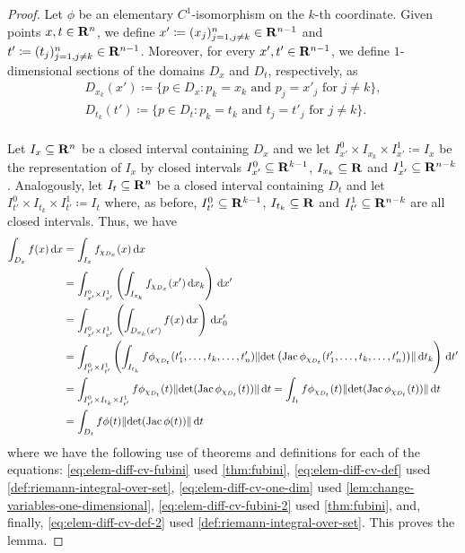 \begin{proof}
Let \(\phi\) be an elementary \(C^1\)-isomorphism on the \(k\)-th
coordinate. Given points \(x, t \in \mathbf{R}^n\), we define \(x' \coloneq (x_j)_{j=1,
j \neq k}^n \in \mathbf{R}^{n-1}\) and \(t' \coloneq (t_j)_{j=1, j \neq k}^n \in
\mathbf{R}^{n-1}\). Moreover, for every \(x', t' \in \mathbf{R}^{n-1}\), we define
\(1\)-dimensional sections of the domains \(D_x\) and \(D_t\), respectively, as
\begin{gather*}
  D_{x_k}(x') \coloneq
  \{p \in D_x \colon p_k = x_k \text{ and } p_j = x'_j \text{ for } j \neq k\}, \\
  D_{t_k}(t') \coloneq
  \{p \in D_t \colon p_k = t_k \text{ and } t_j = t'_j \text{ for } j \neq k\}. \\
\end{gather*}

Let \(I_x \subseteq \mathbf{R}^n\) be a closed interval containing \(D_x\) and we let
\(I_{x'}^0 \times I_{x_k} \times I_{x'}^1 \coloneq I_x\) be the representation
of \(I_x\) by closed intervals \(I_{x'}^0 \subseteq \mathbf{R}^{k-1}\), \(I_{x_k}
\subseteq \mathbf{R}\) and \(I_{x'}^1 \subseteq \mathbf{R}^{n-k}\). Analogously, let \(I_t
\subseteq \mathbf{R}^n\) be a closed interval containing \(D_t\) and let \(I_{t'}^0
\times I_{t_k} \times I_{t'}^1 \coloneq I_t\) where, as before, \(I_{t'}^0
\subseteq \mathbf{R}^{k-1}\), \(I_{t_k} \subseteq \mathbf{R}\) and \(I_{t'}^1 \subseteq
\mathbf{R}^{n-k}\) are all closed intervals. Thus, we have
\begin{align}
  \nonumber
  \int_{D_x} f(x)\, \mathrm{d} x
  &= \int_{I_x} f_{\chi_{D_x}}(x)\, \mathrm{d} x \\
  \label{eq:elem-diff-cv-fubini}
  &= \int_{I_{x'}^0 \times I_{x'}^1} \left(
  \int_{I_{x_k}} f_{\chi_{D_x}}(x')\, \mathrm{d} x_k
  \right)\, \mathrm{d} x' \\
  \label{eq:elem-diff-cv-def}
  &= \int_{I_{x'}^0 \times I_{x'}^1} \left(
    \int_{D_{x_k}(x')} f(x)\, \mathrm{d} x
    \right)\, \mathrm{d} x_0' \\
  \label{eq:elem-diff-cv-one-dim}
  &= \int_{I_{t'}^0 \times I_{t'}^1} \left(
    \int_{I_{t_k}} f\phi_{\chi_{D_t}}(t_1', \dots, t_k, \dots, t_n')
    \lVert\det\left( \operatorname{Jac} \phi_{\chi_{D_t}}(t_1', \dots, t_k, \dots, t_n')
    \right)\rVert\, \mathrm{d} t_k \right)\, \mathrm{d} t' \\
  \label{eq:elem-diff-cv-fubini-2}
  &= \int_{I_{t'}^0 \times I_{t_k} \times I_{t'}^1}
    f \phi_{\chi_{D_t}}(t) \lVert\det(\operatorname{Jac} \phi_{\chi_{D_t}}(t))\rVert\, \mathrm{d} t
  = \int_{I_t}
    f \phi_{\chi_{D_t}}(t) \lVert\det(\operatorname{Jac} \phi_{\chi_{D_t}}(t))\rVert\, \mathrm{d} t
  \\
  \label{eq:elem-diff-cv-def-2}
  &= \int_{D_t} f \phi(t) \lVert\det(\operatorname{Jac} \phi(t))\rVert\, \mathrm{d} t
\end{align}
where we have the following use of theorems and definitions for each of the
equations: \cref{eq:elem-diff-cv-fubini} used \cref{thm:fubini},
\cref{eq:elem-diff-cv-def} used \cref{def:riemann-integral-over-set},
\cref{eq:elem-diff-cv-one-dim} used \cref{lem:change-variables-one-dimensional},
\cref{eq:elem-diff-cv-fubini-2} used \cref{thm:fubini}, and, finally,
\cref{eq:elem-diff-cv-def-2} used \cref{def:riemann-integral-over-set}. This
proves the lemma.
\end{proof}

